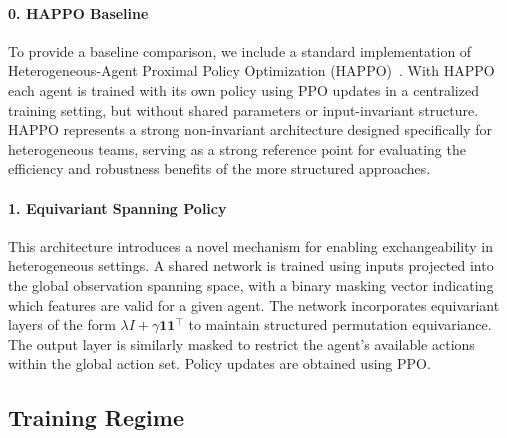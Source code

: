 \documentclass{article}
\begin{document}
\paragraph{0. HAPPO Baseline}
To provide a baseline comparison, we include a standard implementation 
of Heterogeneous-Agent Proximal Policy Optimization (HAPPO)~\cite{zhong2024}. 
With HAPPO each agent is trained with its own policy using PPO updates in a centralized 
training setting, but without shared parameters or input-invariant structure. 
HAPPO represents a strong non-invariant architecture designed specifically 
for heterogeneous teams, serving as a strong reference point for evaluating the 
efficiency and robustness benefits of the more structured approaches.


\paragraph{1. Equivariant Spanning Policy}
This architecture introduces a novel mechanism for enabling 
exchangeability in heterogeneous settings. A shared network 
is trained using inputs projected into the global observation 
spanning space, with a binary masking vector indicating which 
features are valid for a given agent. The network incorporates 
equivariant layers of the form $\lambda I + \gamma \mathbf{11}^\top$ 
to maintain structured permutation equivariance. The output layer 
is similarly masked to restrict the agent's available actions 
within the global action set. Policy updates are obtained using PPO.


\subsection{Training Regime}
\end{document}
